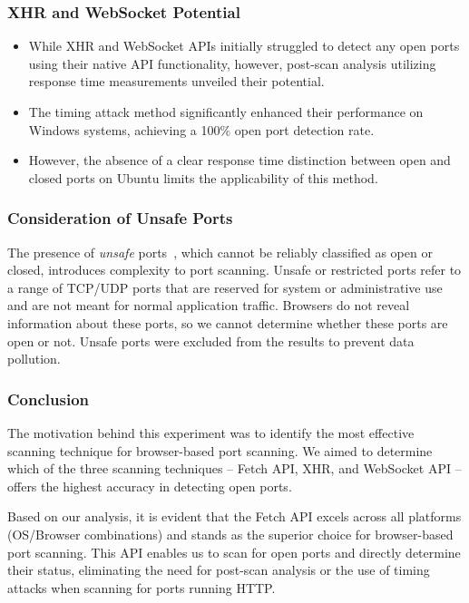 \subsubsection{XHR and WebSocket Potential}

\begin{itemize}
    \item While XHR and WebSocket APIs initially struggled to detect any open ports using their native API functionality, however, post-scan analysis utilizing response time measurements unveiled their potential.
    \item The timing attack method significantly enhanced their performance on Windows systems, achieving a 100\% open port detection rate.
    \item However, the absence of a clear response time distinction between open and closed ports on Ubuntu limits the applicability of this method.
\end{itemize}

\subsubsection{Consideration of Unsafe Ports}

The presence of \emph{unsafe} ports~, which cannot be reliably classified as open or closed, introduces complexity to port scanning.
Unsafe or restricted ports refer to a range of TCP/UDP ports that are reserved for system or administrative use and are not meant for normal application traffic. Browsers do not reveal information about these ports, so we cannot determine whether these ports are open or not. Unsafe ports were excluded from the results to prevent data pollution.


\subsubsection{Conclusion}

The motivation behind this experiment was to identify the most effective scanning technique for browser-based port scanning. We aimed to determine which of the three scanning techniques -- Fetch API, XHR, and WebSocket API -- offers the highest accuracy in detecting open ports.

Based on our analysis, it is evident that the Fetch API excels across all platforms (OS/Browser combinations) and stands as the superior choice for browser-based port scanning. 
This API enables us to scan for open ports and directly determine their status, eliminating the need for post-scan analysis or the use of timing attacks when scanning for ports running HTTP.


